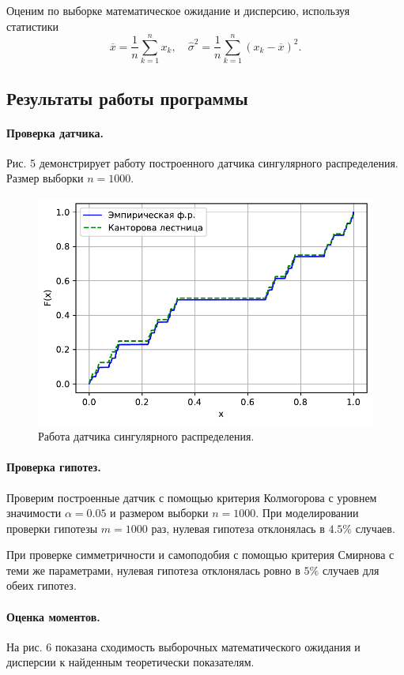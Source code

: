 \documentclass[16pt]{article}
\begin{document}
Оценим по выборке математическое ожидание и дисперсию, используя статистики $$\overline{x} = \dfrac{1}{n}\sum\limits_{k=1}^{n}x_k, \quad {\hat \sigma}^2 = \dfrac{1}{n}\sum\limits_{k=1}^{n}(x_k - \overline{x})^2.$$
\subsection{Результаты работы программы}

\paragraph{Проверка датчика.}
Рис. 5 демонстрирует работу построенного датчика сингулярного распределения. Размер выборки $n = 1000$. 

\begin{figure}[h]
	\center
    \includegraphics[scale=0.7]{2_1.pdf}
    \caption{Работа датчика сингулярного распределения.}
\end{figure}

\paragraph{Проверка гипотез.}
Проверим построенные датчик с помощью критерия Колмогорова с уровнем значимости $\alpha = 0.05$ и размером выборки $n = 1000$. При моделировании проверки гипотезы $m = 1000$ раз, нулевая гипотеза отклонялась в $4.5 \%$  случаев.

При проверке симметричности и самоподобия с помощью критерия Смирнова с теми же параметрами, нулевая гипотеза отклонялась ровно в $5\%$ случаев для обеих гипотез.

\paragraph{Оценка моментов.} На рис. 6 показана сходимость выборочных математического ожидания и дисперсии к найденным теоретически показателям.
\end{document}
